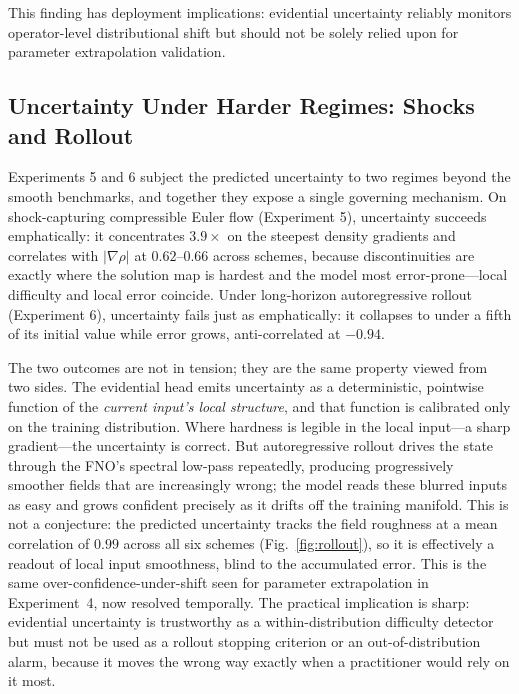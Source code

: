 This finding has deployment implications: evidential uncertainty reliably monitors operator-level distributional
shift but should not be solely relied upon for parameter extrapolation validation.

\subsection{Uncertainty Under Harder Regimes: Shocks and Rollout}

Experiments 5 and 6 subject the predicted uncertainty to two regimes beyond the smooth benchmarks, and together
they expose a single governing mechanism. On shock-capturing compressible Euler flow (Experiment 5), uncertainty
succeeds emphatically: it concentrates $3.9\times$ on the steepest density gradients and correlates with
$|\nabla\rho|$ at $0.62$--$0.66$ across schemes, because discontinuities are exactly where the solution map is
hardest and the model most error-prone---local difficulty and local error coincide. Under long-horizon
autoregressive rollout (Experiment 6), uncertainty fails just as emphatically: it collapses to under a fifth of
its initial value while error grows, anti-correlated at $-0.94$.

The two outcomes are not in tension; they are the same property viewed from two sides. The evidential head emits
uncertainty as a deterministic, pointwise function of the \emph{current input's local structure}, and that
function is calibrated only on the training distribution. Where hardness is legible in the local input---a sharp
gradient---the uncertainty is correct. But autoregressive rollout drives the state through the FNO's spectral
low-pass repeatedly, producing progressively smoother fields that are increasingly wrong; the model reads these
blurred inputs as easy and grows confident precisely as it drifts off the training manifold. This is not a
conjecture: the predicted uncertainty tracks the field roughness at a mean correlation of $0.99$ across all six
schemes (Fig.~\ref{fig:rollout}), so it is effectively a readout of local input smoothness, blind to the
accumulated error. This is the same
over-confidence-under-shift seen for parameter extrapolation in Experiment~4, now resolved temporally. The
practical implication is sharp: evidential uncertainty is trustworthy as a within-distribution difficulty
detector but must not be used as a rollout stopping criterion or an out-of-distribution alarm, because it moves
the wrong way exactly when a practitioner would rely on it most.

